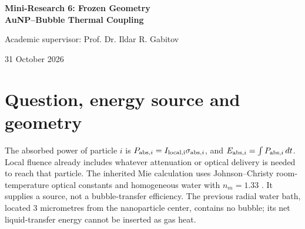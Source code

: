 \documentclass[10pt,a4paper]{article}
\begin{document}
\begin{center}
{\LARGE\bfseries Mini-Research 6: Frozen Geometry\\[3pt] AuNP--Bubble Thermal Coupling}\par
\vspace{5pt}{\large Dimitri Bolt}\par
Academic supervisor: Prof. Dr. Ildar R. Gabitov\par
31 October 2026
\end{center}
\begin{abstract}
I resolve the laser-energy path from a finite gold nanoparticle through water to a spherical gas boundary using axisymmetric heat conduction. A uniform gold node exchanges heat with an explicitly meshed liquid through finite interface conductance; a local Robin condition measures the heat reaching the gas. Frozen geometry supplies an energy-conservative benchmark and a reusable thermal history, while published acoustic trajectories test its applicability. For a 20 nm sphere, 100 nm surface gap and a 10 ns local pulse, \RefEabsFJ\ fJ is absorbed and \RefGasAJ\ aJ reaches the gas within 2 microseconds (\RefFraction\%). Near-contact particle geometry matters: a center-point source can severely underestimate early transfer. However, passive particles move away from the collapsing wall, and the event-specific Peclet and displacement tests reject the frozen approximation near strong collapse. The computed static efficiency is therefore not an achieved acoustic-collapse efficiency. The final scope is stationary thermal coupling. The retained first-order event diagnostics do not validate collapse efficiency; moving boundaries, advection and self-consistent mechanics are deferred to MR7.
\end{abstract}

\section{Question, energy source and geometry}
The absorbed power of particle $i$ is $P_{\mathrm{abs},i}=I_{\rm local,i}\sigma_{\mathrm{abs},i}$, and $E_{\mathrm{abs},i}=\int P_{\mathrm{abs},i}\,dt$. Local fluence already includes whatever attenuation or optical delivery is needed to reach that particle. The inherited Mie calculation uses Johnson--Christy room-temperature optical constants and homogeneous water with $n_m=1.33$ \cite{JC}. It supplies a source, not a bubble-transfer efficiency. The previous radial water bath, located 3 micrometres from the nanoparticle center, contains no bubble; its net liquid-transfer energy cannot be inserted as gas heat.
\end{document}

